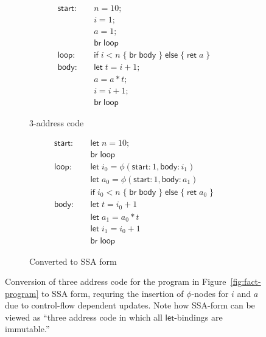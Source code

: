 \documentclass[acmsmall,screen,review]{acmart}
\newcommand{\ms}[1]{\ensuremath{\mathsf{#1}}}
\begin{document}
\begin{figure}
  \begin{subfigure}[t]{.5\textwidth}
    \begin{align*}
      \ms{start}:\quad  & n = 10; \\
                        & i = 1; \\
                        & a = 1; \\
                        & \ms{br}\;\ms{loop} \\
      \ms{loop}: \quad  & \ms{if}\;i < n\;
                          \{\;\ms{br}\;\ms{body}\;\}\;
                          \ms{else}\;\{\;\ms{ret}\;a\;\} \\
      \ms{body}: \quad  & \ms{let}\;t = i + 1; \\
                        & a = a * t; \\
                        & i = i + 1; \\
                        & \ms{br}\;\ms{loop}
    \end{align*}
    \caption{3-address code}
  \end{subfigure}%
  \begin{subfigure}[t]{.5\textwidth}
    \begin{align*}
      \ms{start}:\quad & \ms{let}\;n = 10; \\
      & \ms{br}\;\ms{loop} \\
      \ms{loop}: \quad  & \ms{let}\;i_0 = \phi(\ms{start}: 1, \ms{body}: i_1) \\
                        & \ms{let}\;a_0 = \phi(\ms{start}: 1, \ms{body}: a_1) \\
                        & \ms{if}\;i_0 < n\;
                          \{\;\ms{br}\;\ms{body}\;\}\;
                          \ms{else}\;\{\;\ms{ret}\;a_0\;\} \\
      \ms{body}: \quad  & \ms{let}\;t = i_0 + 1 \\
                        & \ms{let}\;a_1 = a_0 * t \\
                        & \ms{let}\;i_1 = i_0 + 1 \\
                        & \ms{br}\;\ms{loop}
    \end{align*}
    \caption{Converted to SSA form}
    \label{fig:fact-ssa}
  \end{subfigure}
  \caption{
    Conversion of three address code for the program in Figure~\ref{fig:fact-program} to SSA 
    form, requring the insertion of $\phi$-nodes for $i$ and $a$ due to control-flow dependent
    updates. Note how SSA-form can be viewed as ``three address code in which all 
    \ms{let}-bindings are immutable.''
  }
  \Description{}
\end{figure}
 
\end{document}

